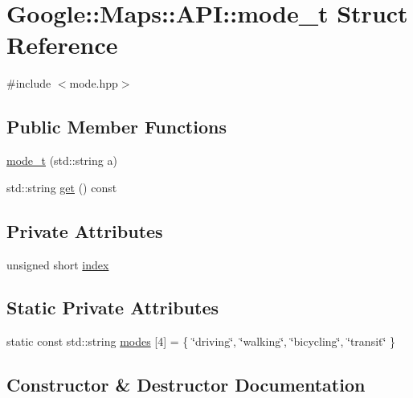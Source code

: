 \hypertarget{a00051}{}\section{Google\+:\+:Maps\+:\+:A\+PI\+:\+:mode\+\_\+t Struct Reference}
\label{a00051}


{\ttfamily \#include $<$mode.\+hpp$>$}

\subsection*{Public Member Functions}
\begin{DoxyCompactItemize}
\item 
\hyperlink{a00051_a9cbdbd6096f389a15acdbefa19490235}{mode\+\_\+t} (std\+::string a)
\item 
std\+::string \hyperlink{a00051_a84b8a1aa0c105d5d6a530777dcd9d4b4}{get} () const
\end{DoxyCompactItemize}
\subsection*{Private Attributes}
\begin{DoxyCompactItemize}
\item 
unsigned short \hyperlink{a00051_ac117d89859504fe68fec3a706b43e4bd}{index}
\end{DoxyCompactItemize}
\subsection*{Static Private Attributes}
\begin{DoxyCompactItemize}
\item 
static const std\+::string \hyperlink{a00051_a752861e4de1fd7afb443595988a86a01}{modes} \mbox{[}4\mbox{]} = \{ \char`\"{}driving\char`\"{}, \char`\"{}walking\char`\"{}, \char`\"{}bicycling\char`\"{}, \char`\"{}transit\char`\"{} \}
\end{DoxyCompactItemize}


\subsection{Constructor \& Destructor Documentation}
\mbox{\label{a00051_a9cbdbd6096f389a15acdbefa19490235}} 
